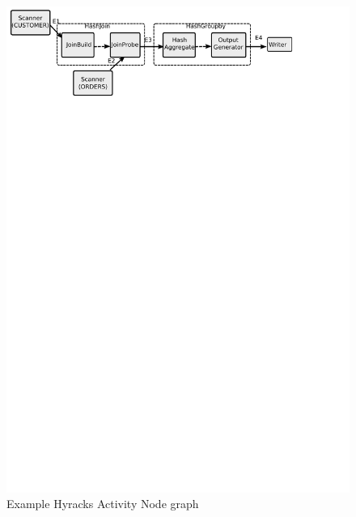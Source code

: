 \vspace{-2mm}
\begin{figure}[htp]
\centering
\includegraphics[scale=0.8]{images/tpch-han}
\caption{Example Hyracks Activity Node graph}\label{fig:example01_han}
\end{figure}
\vspace{-4mm}

